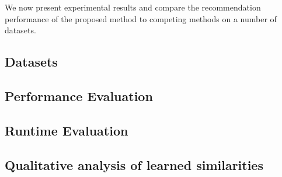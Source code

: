 We now present experimental results and compare the recommendation performance of the proposed method to competing methods on a number of datasets.
\subsection{Datasets}


\subsection{Performance Evaluation}


\subsection{Runtime Evaluation}
\label{section:scalability}


\subsection{Qualitative analysis of learned similarities}
